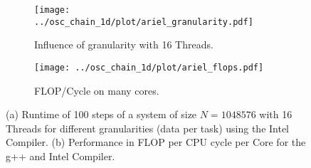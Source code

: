 \documentclass[10pt]{scrartcl}
\begin{document}
\begin{figure}
 \begin{subfigure}[b]{0.49\textwidth}
  \centering
  \texttt{[image: ../osc\_chain\_1d/plot/ariel\_granularity.pdf]}
  \caption{Influence of granularity with 16 Threads.}
  \label{fig:granularity_ariel_1024K}
 \end{subfigure}
 \begin{subfigure}[b]{0.49\textwidth}
  \centering
  \texttt{[image: ../osc\_chain\_1d/plot/ariel\_flops.pdf]}
  \caption{FLOP/Cycle on many cores.}
 \end{subfigure}
 \caption{(a) Runtime of 100 steps of a system of size $N=1048576$ with 16 Threads for different granularities (data per task) using the Intel Compiler. (b) Performance in FLOP per CPU cycle per Core for the g++ and Intel Compiler.} 
 \label{fig:ariel_flops}
\end{figure}
\end{document}
